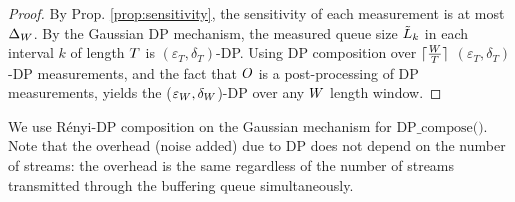\begin{proof}
By Prop. \ref{prop:sensitivity}, the sensitivity of each measurement is at most
  $\Delta_{W}$.
By the Gaussian DP mechanism, the measured queue size $\tilde{L}_{k}$ in each
interval $k$ of length $T$ is $(\varepsilon_{T}, \delta_{T})$-DP.
Using DP composition over $\lceil \frac{W}{T} \rceil$ $(\varepsilon_{T}, \delta_{T})$-DP
measurements, and the fact that $O$ is a post-processing of DP
measurements, yields the ($\varepsilon_{W}, \delta_{W}$)-DP over
any $W$ length window.
\end{proof}
We use R\'enyi-DP composition on the Gaussian mechanism for
$\textrm{DP\_compose()}$.
Note that the overhead (\ie noise added) due to
DP does not depend on the number of streams: the overhead is the same regardless
of the number of streams transmitted through the buffering queue simultaneously.
\fi


